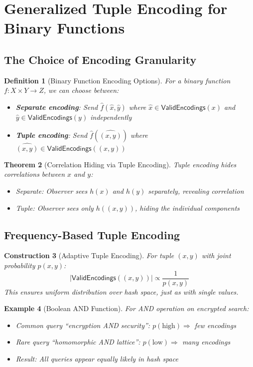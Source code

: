 \documentclass[11pt,final]{article}
\newcommand{\ValidEnc}{\mathsf{ValidEncodings}}
\newtheorem{theorem}{Theorem}[section]
\newtheorem{definition}[theorem]{Definition}
\newtheorem{example}[theorem]{Example}
\newtheorem{construction}[theorem]{Construction}
\begin{document}
\section{Generalized Tuple Encoding for Binary Functions}

\subsection{The Choice of Encoding Granularity}

\begin{definition}[Binary Function Encoding Options]
For a binary function $f: X \times Y \to Z$, we can choose between:
\begin{itemize}
    \item \textbf{Separate encoding}: Send $\hat{f}(\hat{x}, \hat{y})$ where $\hat{x} \in \ValidEnc(x)$ and $\hat{y} \in \ValidEnc(y)$ independently
    \item \textbf{Tuple encoding}: Send $\hat{f}(\widehat{(x,y)})$ where $\widehat{(x,y)} \in \ValidEnc((x,y))$
\end{itemize}
\end{definition}

\begin{theorem}[Correlation Hiding via Tuple Encoding]
Tuple encoding hides correlations between $x$ and $y$:
\begin{itemize}
    \item Separate: Observer sees $h(x)$ and $h(y)$ separately, revealing correlation
    \item Tuple: Observer sees only $h((x,y))$, hiding the individual components
\end{itemize}
\end{theorem}

\subsection{Frequency-Based Tuple Encoding}

\begin{construction}[Adaptive Tuple Encoding]
For tuple $(x,y)$ with joint probability $p(x,y)$:
\begin{equation}
|\ValidEnc((x,y))| \propto \frac{1}{p(x,y)}
\end{equation}
This ensures uniform distribution over hash space, just as with single values.
\end{construction}

\begin{example}[Boolean AND Function]
For AND operation on encrypted search:
\begin{itemize}
    \item Common query ``encryption AND security'': $p(\text{high}) \Rightarrow$ few encodings
    \item Rare query ``homomorphic AND lattice'': $p(\text{low}) \Rightarrow$ many encodings
    \item Result: All queries appear equally likely in hash space
\end{itemize}
\end{example}
\end{document}
